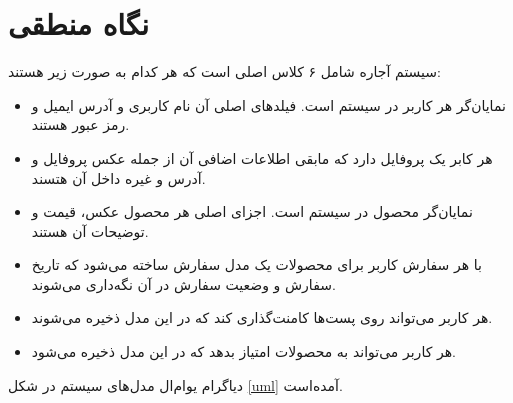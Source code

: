 \section*{
نگاه منطقی
}

سیستم آجاره شامل ۶ کلاس اصلی است که هر کدام به صورت زیر هستند:

\begin{itemize}

\item \textbf{}
نمایان‌گر هر کاربر در سیستم است. فیلدهای اصلی آن نام کاربری و آدرس ایمیل و رمز عبور هستند.

\item \textbf{}
هر کابر یک پروفایل دارد که مابقی اطلاعات اضافی آن از جمله عکس پروفایل و آدرس و غیره داخل آن هتسند.

\item \textbf{}
نمایان‌گر محصول در سیستم است. اجزای اصلی هر محصول عکس، قیمت و توضیحات آن هستند.

\item \textbf{}
با هر سفارش کاربر برای محصولات یک مدل سفارش ساخته می‌شود که تاریخ سفارش و وضعیت سفارش در آن نگه‌داری می‌شوند.

\item \textbf{}
هر کاربر می‌تواند روی پست‌ها کامنت‌گذاری کند که در این مدل ذخیره می‌شوند.

\item \textbf{}
هر کاربر می‌تواند به محصولات امتیاز بدهد که در این مدل ذخیره می‌شود.

\end{itemize}

دیاگرام یوام‌ال
مدل‌های سیستم در شکل 
\ref{uml}
آمده‌است.


